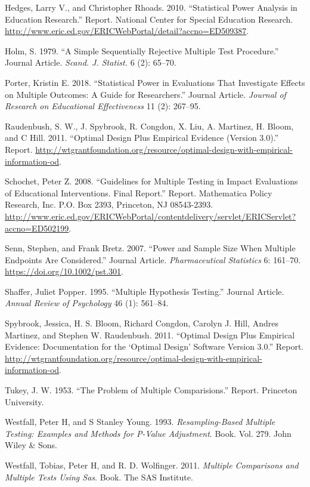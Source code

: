 \documentclass[
]{article}
\newlength{\cslhangindent}
\newenvironment{cslreferences}%
  {\setlength{\parindent}{0pt}%
  \everypar{\setlength{\hangindent}{\cslhangindent}}\ignorespaces}%
  {\par}
\begin{document}
\begin{cslreferences}
\leavevmode\hypertarget{ref-RN30153}{}%
Hedges, Larry V., and Christopher Rhoads. 2010. ``Statistical Power
Analysis in Education Research.'' Report. National Center for Special
Education Research.
\url{http://www.eric.ed.gov/ERICWebPortal/detail?accno=ED509387}.

\leavevmode\hypertarget{ref-RN24282}{}%
Holm, S. 1979. ``A Simple Sequentially Rejective Multiple Test
Procedure.'' Journal Article. \emph{Scand. J. Statist.} 6 (2): 65--70.

\leavevmode\hypertarget{ref-Porter2018}{}%
Porter, Kristin E. 2018. ``Statistical Power in Evaluations That
Investigate Effects on Multiple Outcomes: A Guide for Researchers.''
Journal Article. \emph{Journal of Research on Educational Effectiveness}
11 (2): 267--95.

\leavevmode\hypertarget{ref-RN23884}{}%
Raudenbush, S. W., J. Spybrook, R. Congdon, X. Liu, A. Martinez, H.
Bloom, and C Hill. 2011. ``Optimal Design Plus Empirical Evidence
(Version 3.0).'' Report.
\url{http://wtgrantfoundation.org/resource/optimal-design-with-empirical-information-od}.

\leavevmode\hypertarget{ref-RN23748}{}%
Schochet, Peter Z. 2008. ``Guidelines for Multiple Testing in Impact
Evaluations of Educational Interventions. Final Report.'' Report.
Mathematica Policy Research, Inc. P.O. Box 2393, Princeton, NJ
08543-2393.
\url{http://www.eric.ed.gov/ERICWebPortal/contentdelivery/servlet/ERICServlet?accno=ED502199}.

\leavevmode\hypertarget{ref-RN23881}{}%
Senn, Stephen, and Frank Bretz. 2007. ``Power and Sample Size When
Multiple Endpoints Are Considered.'' Journal Article.
\emph{Pharmaceutical Statistics} 6: 161--70.
\url{https://doi.org/10.1002/pst.301}.

\leavevmode\hypertarget{ref-RN352}{}%
Shaffer, Juliet Popper. 1995. ``Multiple Hypothesis Testing.'' Journal
Article. \emph{Annual Review of Psychology} 46 (1): 561--84.

\leavevmode\hypertarget{ref-RN24179}{}%
Spybrook, Jessica, H. S. Bloom, Richard Congdon, Carolyn J. Hill, Andres
Martinez, and Stephen W. Raudenbush. 2011. ``Optimal Design Plus
Empirical Evidence: Documentation for the `Optimal Design' Software
Version 3.0.'' Report.
\url{http://wtgrantfoundation.org/resource/optimal-design-with-empirical-information-od}.

\leavevmode\hypertarget{ref-RN33098}{}%
Tukey, J. W. 1953. ``The Problem of Multiple Comparisions.'' Report.
Princeton University.

\leavevmode\hypertarget{ref-RN28696}{}%
Westfall, Peter H, and S Stanley Young. 1993. \emph{Resampling-Based
Multiple Testing: Examples and Methods for P-Value Adjustment}. Book.
Vol. 279. John Wiley \& Sons.

\leavevmode\hypertarget{ref-MTSAS}{}%
Westfall, Tobias, Peter H, and R. D. Wolfinger. 2011. \emph{Multiple
Comparisons and Multiple Tests Using Sas}. Book. The SAS Institute.
\end{cslreferences}
\end{document}
